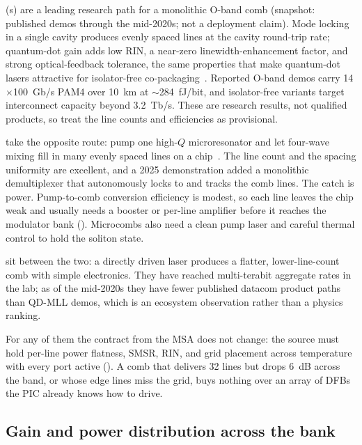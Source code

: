  (s) are a leading
research path for a monolithic O-band comb (snapshot: published demos through
the mid-2020s; not a deployment claim). Mode locking in a single cavity produces
evenly spaced lines at the cavity round-trip rate; quantum-dot gain adds low
RIN, a near-zero linewidth-enhancement factor, and strong optical-feedback
tolerance, the same properties that make quantum-dot lasers attractive for
isolator-free co-packaging~\cite{qdrin}. Reported O-band demos
carry 14$\times$100~Gb/s PAM4 over 10~km at $\sim$284~fJ/bit, and isolator-free
variants target interconnect capacity beyond 3.2~Tb/s. These are research
results, not qualified products, so treat the line counts and efficiencies as
provisional.

 take the opposite route: pump one high-$Q$
microresonator and let four-wave mixing fill in many evenly spaced lines on a
chip~. The line count and the spacing uniformity are
excellent, and a 2025 demonstration added a monolithic demultiplexer that
autonomously locks to and tracks the comb lines. The catch is power.
Pump-to-comb conversion efficiency is modest, so each line leaves the chip weak and
usually needs a booster or per-line amplifier before it reaches the modulator bank
(). Microcombs also need a clean pump laser and careful
thermal control to hold the soliton state.

 sit between the two: a directly
driven laser produces a flatter, lower-line-count comb with simple electronics.
They have reached multi-terabit aggregate rates in the lab; as of the mid-2020s
they have fewer published datacom product paths than QD-MLL demos, which is an
ecosystem observation rather than a physics ranking.

For any of them the contract from the MSA does not change: the source must hold
per-line power flatness, SMSR, RIN, and grid placement across temperature with
every port active (). A comb that delivers 32 lines but
drops 6~dB across the band, or whose edge lines miss the grid, buys nothing over an
array of DFBs the PIC already knows how to drive.

\subsection{Gain and power distribution across the bank}
\label{sec:soa-distribution}

